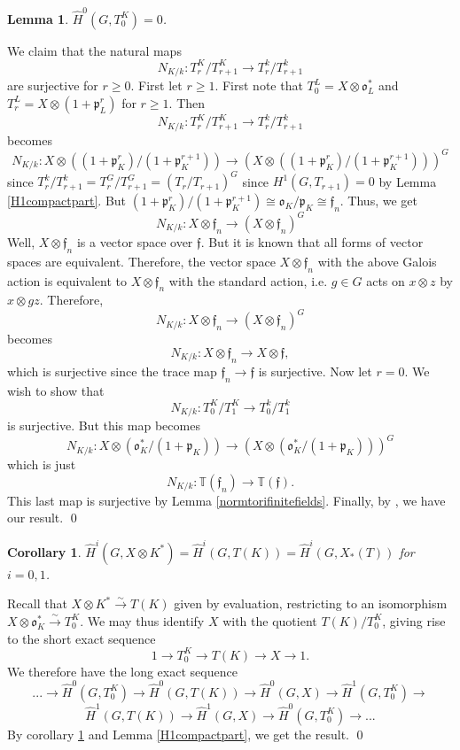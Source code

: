 \documentclass[11pt]{amsart}
\theoremstyle{plain}
\newtheorem{corollary}[enumi]{Corollary}
\newtheorem{lemma}[enumi]{Lemma}
\begin{document}
\begin{lemma}\label{H0compactpart}
$\hat{H}^0(G,T_0^K) = 0$.
\end{lemma}

\proof
We claim that the natural maps $$N_{K/k} : T_r^K / T_{r+1}^K \rightarrow T_r^k / T_{r+1}^k$$ are surjective for $r \geq 0$.  First let $r \geq 1$.  First note that $T_0^L = X \otimes \mathfrak{o}_L^*$ and $T_r^L = X \otimes (1 + \mathfrak{p}_L^r)$ for $r \geq 1$.  Then $$N_{K/k} : T_r^K / T_{r+1}^K \rightarrow T_r^k / T_{r+1}^k$$ becomes $$N_{K/k} : X \otimes \left( (1 + \mathfrak{p}_K^r) / (1 + \mathfrak{p}_K^{r+1}) \right) \rightarrow (X \otimes \left( (1 + \mathfrak{p}_K^r) / (1 + \mathfrak{p}_K^{r+1}) \right) )^G$$
since $T_r^k / T_{r+1}^k = T_r^G / T_{r+1}^G = (T_r / T_{r+1})^G$ since $H^1(G, T_{r+1}) = 0$ by Lemma \ref{H1compactpart}.  But $(1 + \mathfrak{p}_K^r) / (1 + \mathfrak{p}_K^{r+1}) \cong \mathfrak{o}_K / \mathfrak{p}_K \cong \mathfrak{f}_n$.  Thus, we get
$$N_{K/k} : X \otimes \mathfrak{f}_n \rightarrow (X \otimes \mathfrak{f}_n)^G$$
Well, $X \otimes \mathfrak{f}_n$ is a vector space over $\mathfrak{f}$.  But it is known that all forms of vector spaces are equivalent.  Therefore, the vector space $X \otimes \mathfrak{f}_n$ with the above Galois action is equivalent to $X \otimes \mathfrak{f}_n$ with the standard action, i.e. $g \in G$ acts on $x \otimes z$ by $x \otimes gz$.  Therefore, $$N_{K/k} : X \otimes \mathfrak{f}_n \rightarrow (X \otimes \mathfrak{f}_n)^G$$ becomes
$$N_{K/k} : X \otimes \mathfrak{f}_n \rightarrow X \otimes \mathfrak{f},$$
which is surjective since the trace map $\mathfrak{f}_n \rightarrow \mathfrak{f}$ is surjective.  Now let $r = 0$.  We wish to show that $$N_{K/k} : T_0^K / T_1^K \rightarrow T_0^k / T_1^k$$ is surjective.  But this map becomes
$$N_{K/k} : X \otimes \left( \mathfrak{o}_K^* / (1 + \mathfrak{p}_K) \right) \rightarrow (X \otimes \left( \mathfrak{o}_K^* / (1 + \mathfrak{p}_K) \right) )^G$$ which is just
$$N_{K/k} : \mathbb{T}(\mathfrak{f}_n) \rightarrow \mathbb{T}(\mathfrak{f}).$$
This last map is surjective by Lemma \ref{normtorifinitefields}.  Finally, by \cite[Lemma 2, p. 81]{serre1}, we have our result.
\qed

\begin{corollary}\label{reductiontori}
$\hat{H}^i(G, X \otimes K^*) = \hat{H}^i(G, T(K)) = \hat{H}^i(G,X_*(T))$ for $i=0,1$.
\end{corollary}

\proof
Recall that $X \otimes K^* \xrightarrow{\sim} T(K)$ given by evaluation, restricting to an isomorphism $X \otimes \mathfrak{o}_K^* \xrightarrow{\sim} T_0^K$.  We may thus identify $X$ with the quotient $T(K) / T_0^K$, giving rise to the short exact sequence $$1 \rightarrow T_0^K \rightarrow T(K) \rightarrow X \rightarrow 1.$$  We therefore have the long exact sequence $$... \rightarrow \hat{H}^0(G, T_0^K) \rightarrow \hat{H}^0(G, T(K)) \rightarrow \hat{H}^0(G, X) \rightarrow \hat{H}^1(G, T_0^K) \rightarrow $$ $$\hat{H}^1(G, T(K)) \rightarrow \hat{H}^1(G, X) \rightarrow \hat{H}^0(G, T_0^K) \rightarrow ...$$
By corollary \ref{H0compactpart} and Lemma \ref{H1compactpart}, we get the result.
\qed
\end{document}
